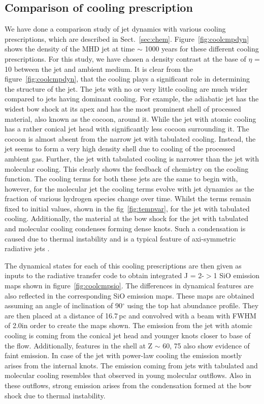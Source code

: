 \documentclass[useAMS,usenatbib]{mn2e}
\begin{document}
\subsection{Comparison of cooling prescription}
\label{ssec:coolres}
We have done a comparison study of jet dynamics with various cooling
prescriptions, which are described in
Sect.~\ref{sec:chem}. Figure~\ref{fig:coolcmpdyn} shows the density of the MHD
jet at time $\sim$ 1000 years for these different cooling
prescriptions. For this study, we have chosen a density contrast at the base of
$\eta$ = 10 between the jet and ambient medium.
It is clear from the figure~\ref{fig:coolcmpdyn}, that the cooling plays a
significant role in determining the structure of the jet. The jets
with no or very little cooling are much wider compared to
jets having dominant cooling. For example, the adiabatic jet
has the widest bow shock at its apex and has the most prominent shell
of processed material, also known as the cocoon,
around it. While the jet with atomic cooling has a rather conical
jet head with significantly less cocoon surrounding it. The cocoon is
almost absent from the narrow jet with tabulated cooling. Instead, the jet
seems to form a very high density shell due to cooling of the
processed ambient gas. Further, the jet with tabulated cooling is narrower than the jet with molecular cooling. This clearly
shows the feedback of chemistry on the cooling function. The cooling
terms for both these jets are the same to begin with, however,
for the molecular jet the cooling terms evolve with jet dynamics as the fraction of
various hydrogen species change over time. Whilst the terms remain fixed to initial values, shown in the fig~\ref{fig:tempvar}, for the jet with tabulated
cooling. Additionally, the material at the bow shock for the jet
with tabulated and molecular cooling condenses forming dense knots. 
Such a condensation is caused due to thermal instability and is 
a typical feature of axi-symmetric radiative jets 
\citep[see, for e.g,][]{Blondin:1990p2130,Cerqueira:1999p15052}.
%

The dynamical states for each of this cooling prescriptions are then 
given as inputs to the radiative transfer code to obtain integrated J = 2-$>$1 SiO emission
maps shown in figure~\ref{fig:coolcmpsio}. The differences in dynamical
features are also reflected in the corresponding SiO emission
maps. These maps are obtained assuming an angle of inclination of
90$^\circ$ using the top hat abundance
profile. They are then placed at a distance of
16.7$\,$pc and convolved with a beam with FWHM of 2.0\arcsec in order
to create the maps shown. 
The emission from the jet with atomic
cooling is coming from the conical jet head and younger knots closer
to base of the flow. Additionally, features in the shell at Z $\sim$
60, 75 also show evidence of faint emission. In case of the jet with
power-law cooling the emission mostly arises from the
internal knots. 
The emission coming from jets with
tabulated and molecular cooling resembles that observed in young molecular outflows.
Also in these outflows, strong emission arises from the
condensation formed at the bow shock due to thermal
instability. 
%
\end{document}
